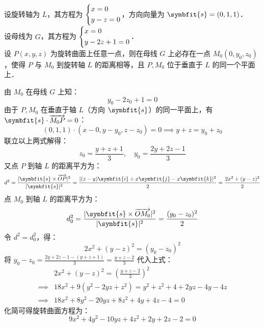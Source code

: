 \begin{solution}
    设旋转轴为 $L$，其方程为 $\begin{dcases} x = 0 \\ y - z = 0 \end{dcases}$，方向向量为 $\symbfit{s} = (0, 1, 1)$．\\
    设母线为 $G$，其方程为 $\begin{dcases} x = 0 \\ y - 2z + 1 = 0 \end{dcases}$．\\
    设 $P(x, y, z)$ 为旋转曲面上任意一点，则在母线 $G$ 上必存在一点 $M_0(0, y_0, z_0)$，使得 $P$ 与 $M_0$ 到旋转轴 $L$ 的距离相等，且 $P, M_0$ 位于垂直于 $L$ 的同一个平面上．

    由 $M_0$ 在母线 $G$ 上知：
    \begin{equation}
        y_0 - 2z_0 + 1 = 0
    \end{equation}
    由于 $P, M_0$ 在垂直于轴 $L$（方向 $\symbfit{s}$）的同一平面上，有 $\symbfit{s} \cdot \overrightarrow{M_0 P} = 0$：
    \begin{equation}
        (0, 1, 1) \cdot (x - 0, y - y_0, z - z_0) = 0 \implies y + z = y_0 + z_0
    \end{equation}
    联立以上两式解得：
    \begin{equation}
        z_0 = \frac{y + z + 1}{3}, \quad y_0 = \frac{2y + 2z - 1}{3}
    \end{equation}
    又点 $P$ 到轴 $L$ 的距离平方为：
    \begin{equation}
        d^2 = \frac{|\symbfit{s} \times \overrightarrow{OP}|^2}{|\symbfit{s}|^2} = \frac{|(z - y) \symbfit{i} + x \symbfit{j} - x \symbfit{k}|^2}{2} = \frac{2x^2 + (y - z)^2}{2}
    \end{equation}
    点 $M_0$ 到轴 $L$ 的距离平方为：
    \begin{equation}
        d_0^2 = \frac{|\symbfit{s} \times \overrightarrow{OM_0}|^2}{|\symbfit{s}|^2} = \frac{(y_0 - z_0)^2}{2}
    \end{equation}
    令 $d^2 = d_0^2$，得：
    \begin{equation}
        2x^2 + (y - z)^2 = (y_0 - z_0)^2
    \end{equation}
    将 $y_0 - z_0 = \frac{2y + 2z - 1 - (y + z + 1)}{3} = \frac{y + z - 2}{3}$ 代入上式：
    \begin{equation}
        \begin{aligned}
                     & 2x^2 + (y - z)^2 = \left( \frac{y + z - 2}{3} \right)^2    \\
            \implies & 18x^2 + 9(y^2 - 2yz + z^2) = y^2 + z^2 + 4 + 2yz - 4y - 4z \\
            \implies & 18x^2 + 8y^2 - 20yz + 8z^2 + 4y + 4z - 4 = 0
        \end{aligned}
    \end{equation}
    化简可得旋转曲面方程为：
    \begin{equation}
        \boxed{9x^2 + 4y^2 - 10yz + 4z^2 + 2y + 2z - 2 = 0}
    \end{equation}
\end{solution}


